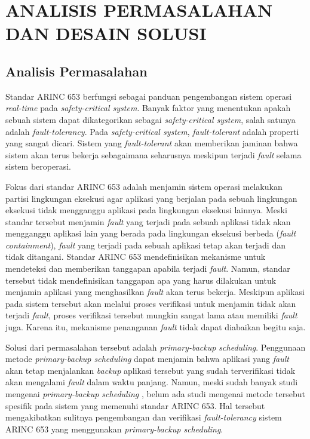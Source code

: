 \chapter{ANALISIS PERMASALAHAN DAN DESAIN SOLUSI}

\section{Analisis Permasalahan}

Standar ARINC 653 berfungsi sebagai panduan pengembangan sistem operasi \textit{real-time} pada \textit{safety-critical system}.
Banyak faktor yang menentukan apakah sebuah sistem dapat dikategorikan sebagai \textit{safety-critical system}, salah satunya adalah \textit{fault-tolerancy}.
Pada \textit{safety\hyp critical system}, \textit{fault-tolerant} adalah properti yang sangat dicari.
Sistem yang \textit{fault-tolerant} akan memberikan jaminan bahwa sistem akan terus bekerja sebagaimana seharusnya meskipun terjadi \textit{fault} selama sistem beroperasi.

Fokus dari standar ARINC 653 adalah menjamin sistem operasi melakukan partisi lingkungan eksekusi agar aplikasi yang berjalan pada sebuah lingkungan eksekusi tidak mengganggu aplikasi pada lingkungan eksekusi lainnya.
Meski standar tersebut menjamin \textit{fault} yang terjadi pada sebuah aplikasi tidak akan mengganggu aplikasi lain yang berada pada lingkungan eksekusi berbeda (\textit{fault containment}), \textit{fault} yang terjadi pada sebuah aplikasi tetap akan terjadi dan tidak ditangani.
Standar ARINC 653 mendefinisikan mekanisme untuk mendeteksi dan memberikan tanggapan apabila terjadi \textit{fault}.
Namun, standar tersebut tidak mendefinisikan tanggapan apa yang harus dilakukan untuk menjamin aplikasi yang menghasilkan \textit{fault} akan terus bekerja.
Meskipun aplikasi pada sistem tersebut akan melalui proses verifikasi untuk menjamin tidak akan terjadi \textit{fault}, proses verifikasi tersebut mungkin sangat lama atau memiliki \textit{fault} juga.
Karena itu, mekanisme penanganan \textit{fault} tidak dapat diabaikan begitu saja.

Solusi dari permasalahan tersebut adalah \textit{primary-backup scheduling}.
Penggunaan metode \textit{primary-backup scheduling} dapat menjamin bahwa aplikasi yang \textit{fault} akan tetap menjalankan \textit{backup} aplikasi tersebut yang sudah terverifikasi tidak akan mengalami \textit{fault} dalam waktu panjang.
Namun, meski sudah banyak studi mengenai \textit{primary-backup scheduling} \citep{Al-Omari2004} \citep{Bertossi2006}, belum ada studi mengenai metode tersebut spesifik pada sistem yang memenuhi standar ARINC 653.
Hal tersebut mengakibatkan sulitnya pengembangan dan verifikasi \textit{fault-tolerancy} sistem ARINC 653 yang menggunakan \textit{primary-backup scheduling}.

